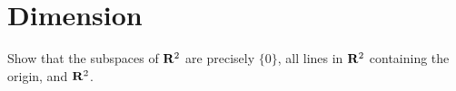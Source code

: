 \section{Dimension}

\begin{exercise}
    Show that the subspaces of $\mathbf{R}^2$ are precisely $\{0\}$, all lines in $\mathbf{R}^2$ containing the origin, and $\mathbf{R}^2$. \\
\end{exercise}

\begin{solution}
    \\ \td \\
\end{solution}